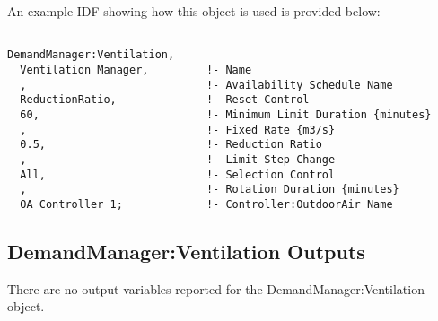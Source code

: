 An example IDF showing how this object is used is provided below:

\begin{lstlisting}

DemandManager:Ventilation,
  Ventilation Manager,         !- Name
  ,                            !- Availability Schedule Name
  ReductionRatio,              !- Reset Control
  60,                          !- Minimum Limit Duration {minutes}
  ,                            !- Fixed Rate {m3/s}
  0.5,                         !- Reduction Ratio
  ,                            !- Limit Step Change
  All,                         !- Selection Control
  ,                            !- Rotation Duration {minutes}
  OA Controller 1;             !- Controller:OutdoorAir Name
\end{lstlisting}

\subsection{DemandManager:Ventilation Outputs}\label{demandmanagerventilation-outputs}

There are no output variables reported for the DemandManager:Ventilation object.
